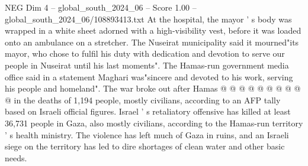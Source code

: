 \begin{textsample}{NEG Dim 4 – global\_south\_2024\_06 – Score 1.00 – global\_south\_2024\_06/108893413.txt}
At the hospital, the mayor ' s body was wrapped in a white sheet adorned with a high-visibility vest, before it was loaded onto an ambulance on a stretcher.
The Nuseirat municipality said it mourned"its mayor, who chose to fulfil his duty with dedication and devotion to serve our people in Nuseirat until his last moments".
The Hamas-run government media office said in a statement Maghari was"sincere and devoted to his work, serving his people and homeland".
The war broke out after Hamas @ @ @ @ @ @ @ @ @ @ in the deaths of 1,194 people, mostly civilians, according to an AFP tally based on Israeli official figures.
Israel ' s retaliatory offensive has killed at least 36,731 people in Gaza, also mostly civilians, according to the Hamas-run territory ' s health ministry.
The violence has left much of Gaza in ruins, and an Israeli siege on the territory has led to dire shortages of clean water and other basic needs.

\end{textsample}
